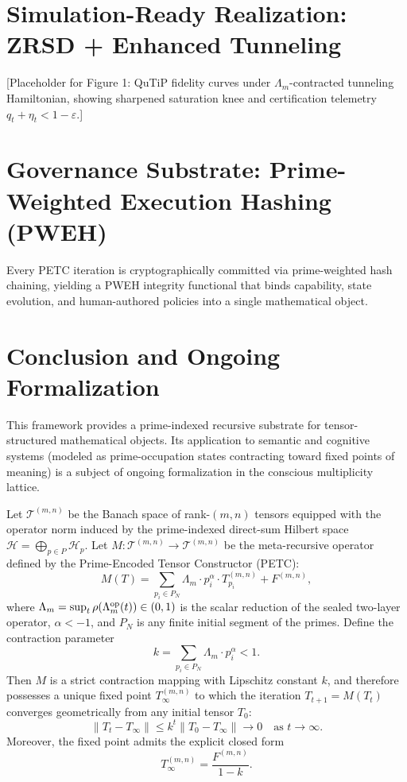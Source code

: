 \documentclass[11pt, a4paper]{article}
\begin{document}
\section{Simulation-Ready Realization: ZRSD + Enhanced Tunneling}
[Placeholder for Figure 1: QuTiP fidelity curves under \(\Lambda_m\)-contracted tunneling Hamiltonian, showing sharpened saturation knee and certification telemetry \(q_t + \eta_t < 1 - \varepsilon\).]

\section{Governance Substrate: Prime-Weighted Execution Hashing (PWEH)}
\begin{corollary}
Every PETC iteration is cryptographically committed via prime-weighted hash chaining, yielding a PWEH integrity functional that binds capability, state evolution, and human-authored policies into a single mathematical object.
\end{corollary}

\section{Conclusion and Ongoing Formalization}
This framework provides a prime-indexed recursive substrate for tensor-structured mathematical objects. Its application to semantic and cognitive systems (modeled as prime-occupation states contracting toward fixed points of meaning) is a subject of ongoing formalization in the conscious multiplicity lattice.


\begin{theorem}
Let \(\mathcal{T}^{(m,n)}\) be the Banach space of rank-\((m,n)\) tensors equipped with the operator norm induced by the prime-indexed direct-sum Hilbert space \(\mathcal{H} = \bigoplus_{p \in P} \mathcal{H}_p\). Let \(M: \mathcal{T}^{(m,n)} \to \mathcal{T}^{(m,n)}\) be the meta-recursive operator defined by the Prime-Encoded Tensor Constructor (PETC):
\[
M(T) = \sum_{p_i \in P_N} \Lambda_m \cdot p_i^\alpha \cdot T_{p_i}^{(m,n)} + F^{(m,n)},
\]
where \(\Lambda_m = \sup_t \rho(\Lambda_m^{\rm op}(t)) \in (0,1)\) is the scalar reduction of the sealed two-layer operator, \(\alpha < -1\), and \(P_N\) is any finite initial segment of the primes. Define the contraction parameter
\[
k = \sum_{p_i \in P_N} \Lambda_m \cdot p_i^\alpha < 1.
\]
Then \(M\) is a strict contraction mapping with Lipschitz constant \(k\), and therefore possesses a unique fixed point \(T_\infty^{(m,n)}\) to which the iteration \(T_{t+1} = M(T_t)\) converges geometrically from any initial tensor \(T_0\):
\[
\|T_t - T_\infty\| \leq k^t \|T_0 - T_\infty\| \to 0 \quad \text{as } t \to \infty.
\]
Moreover, the fixed point admits the explicit closed form
\[
T_\infty^{(m,n)} = \frac{F^{(m,n)}}{1 - k}.
\]
\end{theorem}
\end{document}

